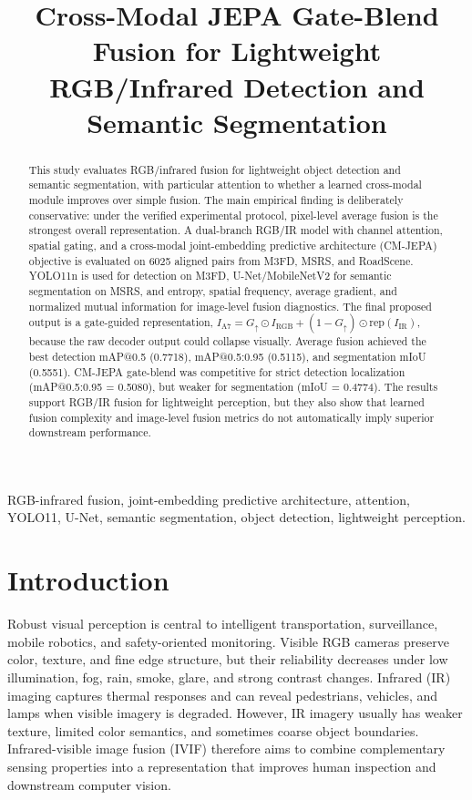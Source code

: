 \documentclass[conference,a4paper]{IEEEtran}
\title{Cross-Modal JEPA Gate-Blend Fusion for Lightweight RGB/Infrared Detection and Semantic Segmentation}
\author{\IEEEauthorblockN{Erol Külüşlü}
\IEEEauthorblockA{Department of Electrical-Electronics and Computer Engineering\\
Abdullah Gül University, Kayseri, Turkey\\
Email: akuluslu54@gmail.com}}
\newcommand{\RGB}{I_{\mathrm{RGB}}}
\newcommand{\IR}{I_{\mathrm{IR}}}
\newcommand{\Ia}{I_{\mathrm{A7}}}
\newcommand{\G}{G_{\uparrow}}
\begin{document}
\maketitle

\begin{abstract}
This study evaluates RGB/infrared fusion for lightweight object detection and semantic segmentation, with particular attention to whether a learned cross-modal module improves over simple fusion. The main empirical finding is deliberately conservative: under the verified experimental protocol, pixel-level average fusion is the strongest overall representation. A dual-branch RGB/IR model with channel attention, spatial gating, and a cross-modal joint-embedding predictive architecture (CM-JEPA) objective is evaluated on 6025 aligned pairs from M3FD, MSRS, and RoadScene. YOLO11n is used for detection on M3FD, U-Net/MobileNetV2 for semantic segmentation on MSRS, and entropy, spatial frequency, average gradient, and normalized mutual information for image-level fusion diagnostics. The final proposed output is a gate-guided representation, \(\Ia=\G \odot \RGB + (1-\G)\odot \mathrm{rep}(\IR)\), because the raw decoder output could collapse visually. Average fusion achieved the best detection mAP@0.5 (0.7718), mAP@0.5:0.95 (0.5115), and segmentation mIoU (0.5551). CM-JEPA gate-blend was competitive for strict detection localization (mAP@0.5:0.95 = 0.5080), but weaker for segmentation (mIoU = 0.4774). The results support RGB/IR fusion for lightweight perception, but they also show that learned fusion complexity and image-level fusion metrics do not automatically imply superior downstream performance.
\end{abstract}

\begin{IEEEkeywords}
RGB-infrared fusion, joint-embedding predictive architecture, attention, YOLO11, U-Net, semantic segmentation, object detection, lightweight perception.
\end{IEEEkeywords}

\section{Introduction}
Robust visual perception is central to intelligent transportation, surveillance, mobile robotics, and safety-oriented monitoring. Visible RGB cameras preserve color, texture, and fine edge structure, but their reliability decreases under low illumination, fog, rain, smoke, glare, and strong contrast changes. Infrared (IR) imaging captures thermal responses and can reveal pedestrians, vehicles, and lamps when visible imagery is degraded. However, IR imagery usually has weaker texture, limited color semantics, and sometimes coarse object boundaries. Infrared-visible image fusion (IVIF) therefore aims to combine complementary sensing properties into a representation that improves human inspection and downstream computer vision.
\end{document}
